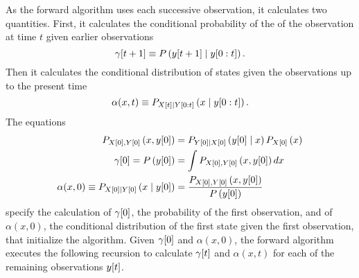 As the forward algorithm uses each successive observation, it
calculates two quantities.  First, it calculates the conditional
probability of the of the observation at time $t$ given earlier
observations
\begin{equation*}
  {\gamma}{[t+1]} \equiv P\left({y}{[t+1]}\mid y[0:t] \right).
\end{equation*}
Then it calculates the conditional distribution of states given the
observations up to the present time
\begin{equation*}
  \alpha(x,t) \equiv P_{{X}{[t]}\mid Y[0:t]} \left(x\mid y[0:t]
  \right).
\end{equation*}
The equations
\begin{align}
  \label{eq:ContInitial}
  P_{{X}{[0]},{Y}{[0]}} \left(x,{y}{[0]} \right) &=
  P_{{Y}{[0]}\mid {X}{[0]}} \left({y}{[0]}\mid x \right)P_{{X}{[0]}}
  \left(x \right) \\
  {\gamma}{[0]} = P\left({y}{[0]} \right) & = \int
  P_{{X}{[0]},{Y}{[0]}}
  \left(x,{y}{[0]} \right) dx \\
  \alpha(x,0) \equiv P_{{X}{[0]}\mid {Y}{[0]}} \left(x\mid {y}{[0]} \right) &=
  \frac{P_{{X}{[0]},{Y}{[0]}} \left(x,{y}{[0]}
    \right)}{P\left({y}{[0]} \right)}
\end{align}
specify the calculation of ${\gamma}{[0]}$, the probability of the first
observation, and of $\alpha(x,0)$, the conditional distribution of the
first state given the first observation, that initialize the
algorithm.  Given ${\gamma}{[0]}$ and $\alpha(x,0)$, the forward algorithm
executes the following recursion to calculate ${\gamma}{[t]}$ and
$\alpha(x,t)$ for each of the remaining observations ${y}{[t]}$.
